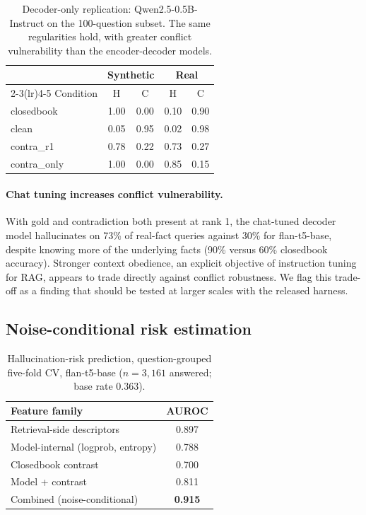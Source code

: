 \documentclass[11pt]{article}
\begin{document}
\begin{table}[tbp]
\centering\small
\caption{Decoder-only replication: Qwen2.5-0.5B-Instruct on the
100-question subset. The same regularities hold, with greater conflict
vulnerability than the encoder-decoder models.}
\label{tab:qwen}
\begin{tabular}{lcccc}
\toprule
& \multicolumn{2}{c}{Synthetic} & \multicolumn{2}{c}{Real} \\
\cmidrule(lr){2-3}\cmidrule(lr){4-5}
Condition & H & C & H & C \\
\midrule
closedbook   & 1.00 & 0.00 & 0.10 & 0.90 \\
clean        & 0.05 & 0.95 & 0.02 & 0.98 \\
contra\_r1   & 0.78 & 0.22 & 0.73 & 0.27 \\
contra\_only & 1.00 & 0.00 & 0.85 & 0.15 \\
\bottomrule
\end{tabular}
\end{table}

\paragraph{Chat tuning increases conflict vulnerability.}
With gold and contradiction both present at rank 1, the chat-tuned
decoder model hallucinates on 73\% of real-fact queries against 30\%
for flan-t5-base, despite knowing more of the underlying facts (90\%
versus 60\% closedbook accuracy). Stronger context obedience, an
explicit objective of instruction tuning for RAG, appears to trade
directly against conflict robustness. We flag this trade-off as a
finding that should be tested at larger scales with the released
harness.

\subsection{Noise-conditional risk estimation}\label{sec:estimation}

\begin{table}[tbp]
\centering\small
\caption{Hallucination-risk prediction, question-grouped five-fold CV,
flan-t5-base ($n = 3{,}161$ answered; base rate 0.363).}
\label{tab:auroc}
\begin{tabular}{lc}
\toprule
Feature family & AUROC \\
\midrule
Retrieval-side descriptors        & 0.897 \\
Model-internal (logprob, entropy) & 0.788 \\
Closedbook contrast               & 0.700 \\
Model + contrast                  & 0.811 \\
Combined (noise-conditional)      & \textbf{0.915} \\
\bottomrule
\end{tabular}
\end{table}
\end{document}
